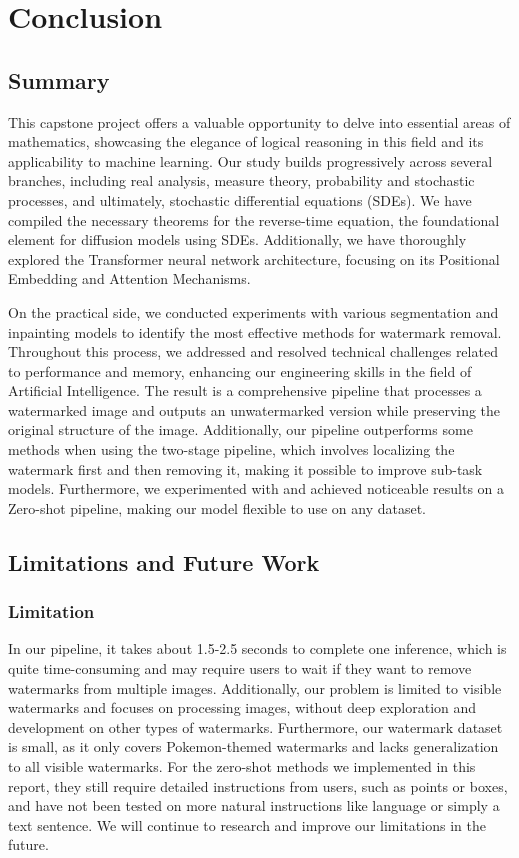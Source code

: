 \chapter{Conclusion}
\section{Summary}

This capstone project offers a valuable opportunity to delve into essential areas of mathematics, showcasing the elegance of logical reasoning in this field and its applicability to machine learning. Our study builds progressively across several branches, including real analysis, measure theory, probability and stochastic processes, and ultimately, stochastic differential equations (SDEs). We have compiled the necessary theorems for the reverse-time equation, the foundational element for diffusion models using SDEs. Additionally, we have thoroughly explored the Transformer neural network architecture, focusing on its Positional Embedding and Attention Mechanisms.

On the practical side, we conducted experiments with various segmentation and inpainting models to identify the most effective methods for watermark removal. Throughout this process, we addressed and resolved technical challenges related to performance and memory, enhancing our engineering skills in the field of Artificial Intelligence. The result is a comprehensive pipeline that processes a watermarked image and outputs an unwatermarked version while preserving the original structure of the image. Additionally, our pipeline outperforms some methods when using the two-stage pipeline, which involves localizing the watermark first and then removing it, making it possible to improve sub-task models. Furthermore, we experimented with and achieved noticeable results on a Zero-shot pipeline, making our model flexible to use on any dataset.



\section{Limitations and Future Work}
\subsection{Limitation}

In our pipeline, it takes about 1.5-2.5 seconds to complete one inference, which is quite time-consuming and may require users to wait if they want to remove watermarks from multiple images. Additionally, our problem is limited to visible watermarks and focuses on processing images, without deep exploration and development on other types of watermarks. Furthermore, our watermark dataset is small, as it only covers Pokemon-themed watermarks and lacks generalization to all visible watermarks. For the zero-shot methods we implemented in this report, they still require detailed instructions from users, such as points or boxes, and have not been tested on more natural instructions like language or simply a text sentence. We will continue to research and improve our limitations in the future. 


